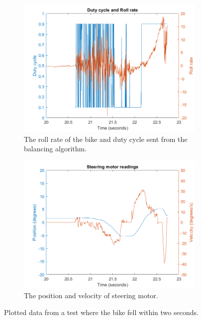 \begin{figure}[H]
    \begin{subfigure}{.5\textwidth}
        \centering
        \includegraphics[width=\textwidth]{include/test6_control.png}
        \caption{The roll rate of the bike and duty cycle sent from the balancing algorithm.}
        \label{fig:test6_control}
    \end{subfigure}
    \begin{subfigure}{.5\textwidth}
        \centering
        \includegraphics[width=\textwidth]{include/test6_motor.png}
        \caption{The position and velocity of steering motor.}
        \label{fig:test6_motor}
    \end{subfigure}
\caption{Plotted data from a test where the bike fell within two seconds.}
\label{fig:test6}
\end{figure}


